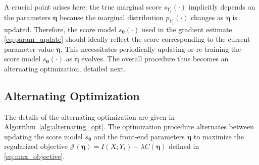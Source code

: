\documentclass[conference]{IEEEtran}
\begin{document}
A crucial point arises here: the true marginal score $s_{Y_t}(\cdot)$ 
implicitly depends on the parameters $\bm \eta$ because the marginal distribution $p_{Y_t}(\cdot)$ 
changes as $\bm \eta$ is updated. Therefore, the score model $s_{\bm \theta}(\cdot)$ 
used in the gradient estimate \eqref{eq:param_update} should ideally reflect 
the score corresponding to the current parameter value $\bm \eta$. 
This necessitates periodically updating or re-training the score model $s_{\bm \theta}(\cdot)$ 
as $\bm \eta$ evolves. The overall procedure thus becomes an alternating optimization, 
detailed next.


\subsection{Alternating Optimization}
\label{subsec:alternating_optimization}

The details of the alternating optimization are given in Algorithm~\ref{alg:alternating_opt}.
The optimization procedure alternates between updating the score model $s_{\bm \theta}$ 
and the front-end parameters $\bm \eta$ to maximize the regularized objective 
$\mathcal{J}(\bm\eta) = I(X;Y_t) - \lambda C(\bm\eta)$ defined in \eqref{eq:max_objective}. 
\end{document}
